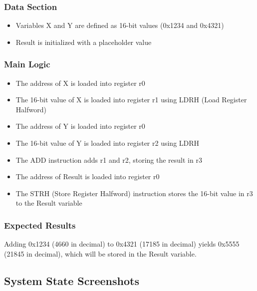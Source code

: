 \documentclass[12pt,a4paper]{article}
\begin{document}
\subsubsection{Data Section}
\begin{itemize}
    \item Variables X and Y are defined as 16-bit values (0x1234 and 0x4321)
    \item Result is initialized with a placeholder value
\end{itemize}

\subsubsection{Main Logic}
\begin{itemize}
    \item The address of X is loaded into register r0
    \item The 16-bit value of X is loaded into register r1 using LDRH (Load Register Halfword)
    \item The address of Y is loaded into register r0
    \item The 16-bit value of Y is loaded into register r2 using LDRH
    \item The ADD instruction adds r1 and r2, storing the result in r3
    \item The address of Result is loaded into register r0
    \item The STRH (Store Register Halfword) instruction stores the 16-bit value in r3 to the Result variable
\end{itemize}

\subsubsection{Expected Results}
Adding 0x1234 (4660 in decimal) to 0x4321 (17185 in decimal) yields 0x5555 (21845 in decimal), which will be stored in the Result variable.

\subsection{System State Screenshots}
\end{document}
